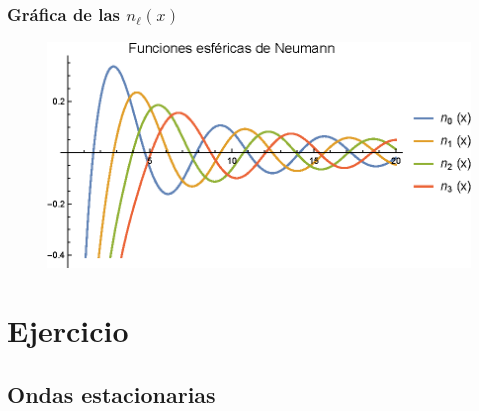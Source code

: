 \documentclass[12pt]{beamer}
\begin{document}
\begin{frame}
\frametitle{Gráfica de las $n_{\ell} (x)$}
\begin{figure}[H]
    \centering
    \includegraphics[scale=0.95]{Imagenes/Plot_Esfericas_Neumann.eps}
\end{figure}
\end{frame}

\section{Ejercicio}
\subsection{Ondas estacionarias}
\end{document}
